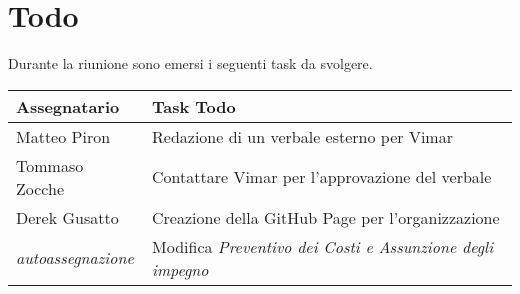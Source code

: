 \section{Todo}
Durante la riunione sono emersi i seguenti task da svolgere.

\begin{center}
  \begin{tabular}{|p{5cm}|p{8cm}|}
    \hline
    \textbf{Assegnatario}       & \textbf{Task Todo} \\ 
    \hline
     Matteo Piron   &  Redazione di un verbale esterno per Vimar  \\ \hline
      Tommaso Zocche   &  Contattare Vimar per l'approvazione del verbale  \\ \hline
     Derek Gusatto   &  Creazione della GitHub Page per l'organizzazione \\ \hline
    \textit{autoassegnazione}   &  Modifica  \textit{Preventivo dei Costi e Assunzione degli impegno}\\ \hline
  \end{tabular}
\end{center}
